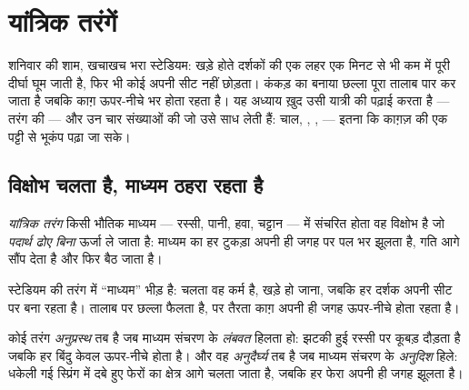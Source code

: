 \chapter{यांत्रिक तरंगें}\label{ch:g12:mechanical-waves}

शनिवार की शाम, खचाखच भरा स्टेडियम: खड़े होते दर्शकों की एक लहर एक मिनट से भी
कम में पूरी दीर्घा घूम जाती है, फिर भी कोई अपनी सीट नहीं छोड़ता। कंकड़ का
बनाया छल्ला पूरा तालाब पार कर जाता है जबकि काग़ ऊपर-नीचे भर होता रहता है। यह
अध्याय ख़ुद उसी यात्री की पढ़ाई करता है --- तरंग की --- और उन चार
संख्याओं की जो उसे साध लेती हैं: चाल, , ,
 --- इतना कि काग़ज़ की एक पट्टी से भूकंप पढ़ा जा सके।

\section{विक्षोभ चलता है, माध्यम ठहरा रहता है}

\begin{definition}[यांत्रिक तरंग]\label{def:g12:mechanical-waves:wave}
\emph{यांत्रिक तरंग} किसी भौतिक माध्यम --- रस्सी, पानी,
हवा, चट्टान --- में संचरित होता वह विक्षोभ है जो \emph{पदार्थ ढोए बिना}
ऊर्जा ले जाता है: माध्यम का हर टुकड़ा अपनी ही जगह पर पल भर झूलता है,
गति आगे सौंप देता है और फिर बैठ जाता है।
\end{definition}

\begin{example}[पदार्थ का कोई परिवहन नहीं]\label{ex:g12:mechanical-waves:transport}
स्टेडियम की तरंग में ``माध्यम'' भीड़ है: चलता वह कर्म है, खड़े हो
जाना, जबकि हर दर्शक अपनी सीट पर बना रहता है। तालाब पर छल्ला फैलता है, पर तैरता
काग़ अपनी ही जगह ऊपर-नीचे होता रहता है।
\end{example}

\begin{definition}[अनुप्रस्थ और अनुदैर्घ्य तरंगें]\label{def:g12:mechanical-waves:transverse}
कोई तरंग \emph{अनुप्रस्थ} तब है जब माध्यम
संचरण के \emph{लंबवत} हिलता हो: झटकी हुई रस्सी पर कूबड़ दौड़ता है जबकि हर
बिंदु केवल ऊपर-नीचे होता है। और वह \emph{अनुदैर्घ्य}
तब है जब माध्यम संचरण के \emph{अनुदिश} हिले: धकेली गई स्प्रिंग में दबे हुए
फेरों का क्षेत्र आगे चलता जाता है, जबकि हर फेरा अपनी ही जगह
झूलता है।
\end{definition}

